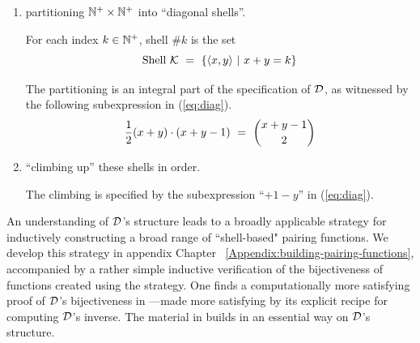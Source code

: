 \begin{enumerate}
\item
partitioning $\mathbb{N}^+ \times \mathbb{N}^+$ into ``diagonal shells''.

\smallskip

For each index $k \in \mathbb{N}^+$, shell \#$k$ is the set
\[ \mbox{Shell } \mbox{$\cal K$} \ = \ \{ \langle x,y \rangle \ | \ x+y = k \} \]

\smallskip

The partitioning is an integral part of the specification of $\mbox{$\cal D$}$, as witnessed by the following subexpression in (\ref{eq:diag}).
\[
{1 \over 2} (x+y) \cdot (x+y-1) \ = \ {{x+y-1} \choose 2}
\]

\item
``climbing up'' these shells in order.

\smallskip

The climbing is specified by the subexpression ``$+1-y$'' in (\ref{eq:diag}).
\end{enumerate}
\bigskip

\noindent {}
\bigskip

An understanding of $\mbox{$\cal D$}$'s structure leads to a broadly applicable strategy for inductively constructing a broad range of ``shell-based" pairing functions.  We develop this strategy in appendix Chapter ~\ref{Appendix:building-pairing-functions}, accompanied by a rather simple inductive verification of the bijectiveness of functions created using the strategy.  One finds a computationally more satisfying proof of $\mbox{$\cal D$}$'s bijectiveness in \cite{Davis58}---made more satisfying by its explicit recipe for computing $\mbox{$\cal D$}$'s inverse.  The material in \cite{Davis58} builds in an essential way on $\mbox{$\cal D$}$'s structure.

\bigskip

